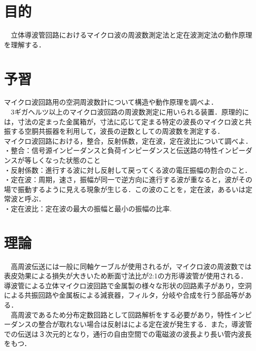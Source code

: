 

\pagestyle{fancy}
\section{目的}
　立体導波管回路におけるマイクロ波の周波数測定法と定在波測定法の動作原理を理解する．

\section{予習}
マイクロ波回路用の空洞周波数計について構造や動作原理を調べよ．\\
　3ギガヘルツ以上のマイクロ波回路の周波数測定に用いられる装置．原理的には，寸法の定まった金属箱が，寸法に応じて定まる特定の波長のマイクロ波と共振する空胴共振器を利用して，波長の逆数としての周波数を測定する．\\

マイクロ波回路における，整合，反射係数，定在波，定在波比について調べよ．\\
・整合：信号源インピーダンスと負荷インピーダンスと伝送路の特性インピーダンスが等しくなった状態のこと\\
・反射係数：進行する波に対し反射して戻ってくる波の電圧振幅の割合のこと．\\
・定在波：周期，速さ，振幅が同一で逆方向に進行する波が重なると，波がその場で振動するように見える現象が生じる．この波のことを，定在波，あるいは定常波と呼ぶ．\\
・定在波比：定在波の最大の振幅と最小の振幅の比率.\\

\section{理論}
　高周波伝送には一般に同軸ケーブルが使用されるが，マイクロ波の周波数では表皮効果による損失が大きいため断面寸法比が2:1の方形導波管が使用される．\\
導波管による立体マイクロ波回路で金属製の様々な形状の回路素子があり，空洞による共振回路や金属板による減衰器，フィルタ，分岐や合成を行う部品等がある．\\
　高周波であるため分布定数回路として回路解析をする必要があり，特性インピーダンスの整合が取れない場合は反射はによる定在波が発生する．また，導波管での伝送は３次元的となり，通行の自由空間での電磁波の波長より長い管内波長をもつ．\\

